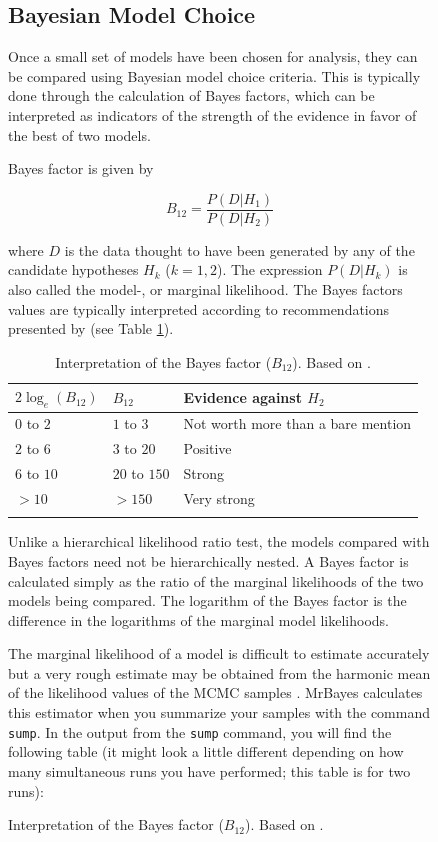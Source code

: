 \documentclass[12pt]{book}
\newcommand{\ttt}[1]{\texttt{#1}}
\begin{document}
\begin{figure}[h]
\subsection{Bayesian Model Choice}
\label{bayesianModelChoice}

Once a small set of models have been chosen for analysis, they can be compared using Bayesian model
choice criteria. This is typically done through the calculation of Bayes factors, which can be
interpreted as indicators of the strength of the evidence in favor of the best of two models.

Bayes factor is given by

$$
B_{12} = \frac{P(D|H_{1})}{P(D|H_{2})}
$$

where $D$ is the data thought to have been generated by any of the candidate hypotheses
$H_{k}$ ($k = 1,2$). The expression $P(D|H_{k})$ is also called the model-, or marginal
likelihood. The Bayes factors values are typically interpreted according to recommendations
presented by \citet{kass95} (see Table \ref{table:bftable}).

\begin{longtable}[h!]{@{}lll@{}}
\toprule
\(2\log_{e}(B_{12})\) & \(B_{12}\) & Evidence against
\(H_{2}\)\tabularnewline
\midrule
\endhead
\(0\) to \(2\) & \(1\) to \(3\) & Not worth more than a bare
mention\tabularnewline
\(2\) to \(6\) & \(3\) to \(20\) & Positive\tabularnewline
\(6\) to \(10\) & \(20\) to \(150\) & Strong\tabularnewline
\(>10\) & \(>150\) & Very strong\tabularnewline
\bottomrule
\caption{Interpretation of the Bayes factor ($B_{12}$). Based on \citep{kass95}.}
\label{table:bftable}
\end{longtable}

Unlike a hierarchical likelihood ratio test, the models compared with Bayes factors need not be
hierarchically nested. A Bayes factor is calculated simply as the ratio of the marginal likelihoods
of the two models being compared. The logarithm of the Bayes factor is the difference in the
logarithms of the marginal model likelihoods.

The marginal likelihood of a model is difficult to estimate accurately but a very rough estimate
may be obtained from the harmonic mean of the likelihood values of the MCMC samples
\citep{newton94}. MrBayes calculates this estimator when you summarize your samples with the
command \ttt{sump}. In the output from the \ttt{sump} command, you will find the following table
(it might look a little different depending on how many simultaneous runs you have performed; this
table is for two runs):


\end{figure}
\end{document}
